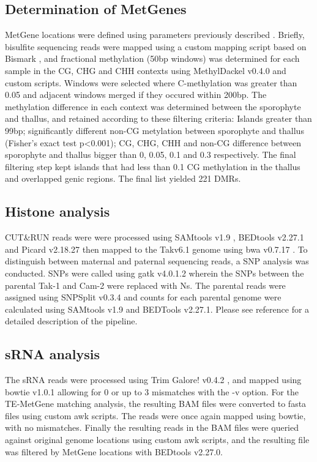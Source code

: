 \subsection{Determination of MetGenes}

MetGene locations were defined using parameters previously described \cite{jimmythesis}. Briefly, bisulfite sequencing reads were mapped using a custom mapping script based on Bismark \cite{RN229}, and fractional methylation (50bp windows) was determined for each sample in the  CG, CHG and CHH contexts using MethylDackel v0.4.0 and custom scripts. Windows were selected where C-methylation was greater than 0.05 and adjacent windows merged if they occured within 200bp. The methylation difference in each context was determined between the sporophyte and thallus, and retained according to these filtering criteria: Islands greater than 99bp; significantly different non-CG metylation between sporophyte and thallus (Fisher's exact test p<0.001); CG, CHG, CHH and non-CG difference between sporophyte and thallus bigger than 0, 0.05, 0.1 and 0.3 respectively. The final filtering step kept islands that had less than 0.1 CG methylation in the thallus and overlapped genic regions. The final list yielded 221 DMRs.

\subsection{Histone analysis}

CUT\&RUN reads were were processed using SAMtools v1.9 \cite{RN174}, BEDtools v2.27.1 \cite{RN90} and Picard v2.18.27 \cite{RN173} then mapped to the Takv6.1 genome \cite{RN179} using bwa v0.7.17 \cite{RN182}. To distinguish between maternal and paternal sequencing reads, a SNP analysis was conducted. SNPs were called using gatk v4.0.1.2 \cite{RN177} wherein the SNPs between the parental Tak-1 and Cam-2 were replaced with Ns. The parental reads were assigned using SNPSplit v0.3.4 \cite{RN178} and counts for each parental genome were calculated using SAMtools v1.9 and BEDTools v2.27.1. Please see reference \cite{RN160}  for a detailed description of the pipeline. 

\subsection{sRNA analysis}

The sRNA reads were processed using Trim Galore! v0.4.2 \cite{trim_galore}, and mapped using bowtie v1.0.1 \cite{RN89} allowing for 0 or up to 3 mismatches with the -v option. For the TE-MetGene matching analysis, the resulting BAM files were converted to fasta files using custom awk scripts. The reads were once again mapped using bowtie, with no mismatches. Finally the resulting reads in the BAM files were queried against original genome locations using custom awk scripts, and the resulting file was filtered by MetGene locations with BEDtools v2.27.0.

